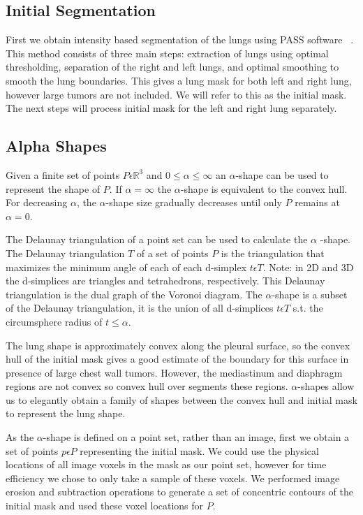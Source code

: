 \documentclass{llncs}
\begin{document}
\subsection{Initial Segmentation}
%

First we obtain intensity based segmentation of the lungs using PASS software ~\cite{guo2008}. This method consists of three main steps: extraction of lungs using optimal thresholding, separation of the right and left lungs, and optimal smoothing to smooth the lung boundaries. This gives a lung mask for both left and right lung, however large tumors are not included. We will refer to this as the initial mask. The next steps will process initial mask for the left and right lung separately. 
%
\subsection{Alpha Shapes}
%
 Given a finite set of points $P \epsilon \mathbb{R}^3$ and $ 0 \leq \alpha \leq \infty $ an $\alpha$-shape can be used to represent the shape of $P$. If $\alpha = \infty$ the $\alpha$-shape is equivalent to the convex hull. For decreasing $\alpha$, the $\alpha$-shape size gradually decreases until only $P$ remains at $\alpha=0$. 

The Delaunay triangulation of a point set can be used to calculate the $\alpha$ -shape.  The Delaunay triangulation $T$ of a set of points $P$ is the triangulation that maximizes the minimum angle of each of each d-simplex $t \epsilon T$. Note: in 2D and 3D the d-simplices are triangles and tetrahedrons, respectively. This Delaunay triangulation is the dual graph of the Voronoi diagram. The $\alpha$-shape is a subset of the Delaunay triangulation, it is the union of all d-simplices $t \epsilon T$ s.t. the circumsphere radius of $t \leq \alpha$. 

The lung shape is approximately convex along the pleural surface, so the convex hull of the initial mask gives a good estimate of the boundary for this surface in presence of large chest wall tumors. However, the mediastinum and diaphragm regions are not convex so convex hull over segments these regions. $\alpha$-shapes allow us to elegantly obtain a family of shapes between the convex hull and initial mask to represent the lung shape. 


As the $\alpha$-shape is defined on a point set, rather than an image, first we obtain a set of points $p \epsilon P$ representing the initial mask. We could use the physical locations of all image voxels in the mask as our point set, however for time efficiency we chose to only take a sample of these voxels. We performed image erosion and subtraction operations to generate a set of concentric contours of the initial mask and used these voxel locations for $P$. 
\end{document}
